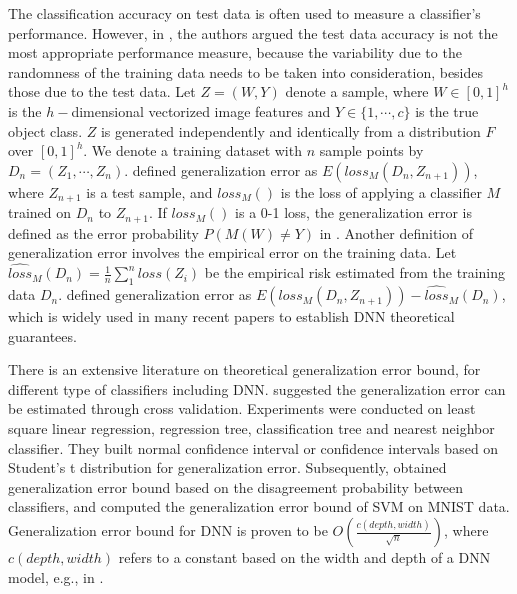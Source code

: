 \documentclass[12pt]{article}
\begin{document}
The classification accuracy on test data is often used to measure a
classifier's performance. However, in \cite{ge-definition-bengio-2003}, the
authors argued the test data accuracy is not the most appropriate performance
measure, because the variability due to the randomness of the
training data needs to be 
taken into consideration, besides those due to the test data. 
Let $Z = (W,Y)$ denote a sample, where $W \in [0,1]^h$ is the $h-$dimensional
vectorized image features and $Y \in \{1, \cdots, c\}$ is the true
object class. $Z$ is generated independently and identically from a
distribution $F$ over $[0,1]^h$. We denote a training 
dataset with $n$ sample points by $D_n=(Z_1, \cdots, Z_n)$.
\cite{ge-definition-bengio-2003} defined
generalization error as $E(loss_M(D_n,Z_{n+1}))$, where 
$Z_{n+1}$ is a test sample, and $loss_M()$ is the loss of applying a 
classifier $M$ trained on $D_n$ to $Z_{n+1}$. If $loss_M()$ is a 0-1
loss, the generalization error is 
defined as the error probability $P(M(W)\neq Y)$  in
\cite{ge-svm-mnist-2005}.   
Another definition of generalization error involves the empirical
error on the training data. 
Let $\hat{loss}_{M}(D_n) = \frac{1}{n} \sum_1^n loss(Z_i)$ be the empirical
risk estimated from the training data $D_n$.
\cite{ge-rethink-2017} defined generalization error as
$E(loss_{M}(D_n,Z_{n+1})) - \hat{loss}_{M}(D_n)$, which is widely used
in many recent papers to establish DNN theoretical guarantees. 

There is an extensive literature on theoretical generalization error bound, for different type of classifiers including DNN. 
\cite{ge-definition-bengio-2003} suggested the
generalization error can be estimated through cross
validation. Experiments were conducted on least square linear
regression, regression tree, classification tree and nearest neighbor
classifier. They built normal
confidence interval or confidence intervals based on Student's t
distribution for generalization error.   
Subsequently, \cite{ge-svm-mnist-2005} obtained generalization error
bound based on the disagreement probability between classifiers, and
computed the generalization error bound of SVM on MNIST data.   
Generalization error bound for DNN is proven to be
$O(\frac{c(depth,width)}{\sqrt{n}})$, where $c(depth,width)$ refers to
a constant based on the width and depth of a DNN model, e.g., in 
\cite{ge-bound-1,ge-bound-2,ge-bound-3,ge-bound-4,ge-bound-5,ge-bound-6,ge-bound-7,ge-bound-8}.  
\end{document}
